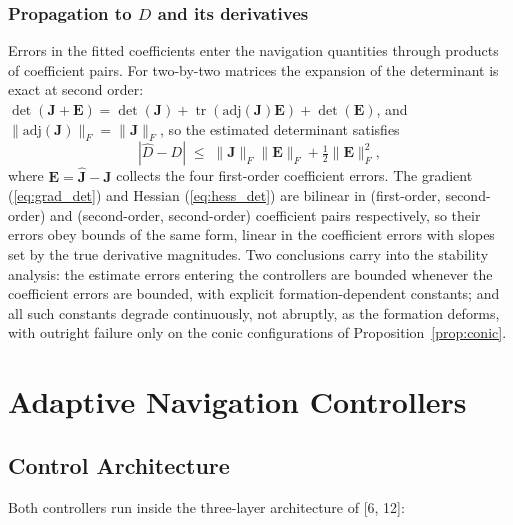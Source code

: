 \documentclass[lettersize,journal]{IEEEtran}
\begin{document}
\subsubsection{Propagation to $D$ and its derivatives}
Errors in the fitted coefficients enter the navigation quantities through
products of coefficient pairs. For two-by-two matrices the expansion of
the determinant is exact at second order:
$\det(\mathbf{J} + \mathbf{E}) = \det(\mathbf{J}) +
\operatorname{tr}(\mathrm{adj}(\mathbf{J})\mathbf{E}) + \det(\mathbf{E})$,
and $\|\mathrm{adj}(\mathbf{J})\|_F = \|\mathbf{J}\|_F$, so the estimated
determinant satisfies
\begin{equation}
    |\hat{D} - D| \;\leq\; \|\mathbf{J}\|_F \|\mathbf{E}\|_F
    + \tfrac{1}{2}\|\mathbf{E}\|_F^2,
    \label{eq:det_perturbation}
\end{equation}
where $\mathbf{E} = \hat{\mathbf{J}} - \mathbf{J}$ collects the four
first-order coefficient errors. The gradient (\ref{eq:grad_det}) and
Hessian (\ref{eq:hess_det}) are bilinear in (first-order, second-order)
and (second-order, second-order) coefficient pairs respectively, so their
errors obey bounds of the same form, linear in the coefficient errors
with slopes set by the true derivative magnitudes. Two conclusions carry
into the stability analysis: the estimate errors entering the controllers
are bounded whenever the coefficient errors are bounded, with explicit
formation-dependent constants; and all such constants degrade
continuously, not abruptly, as the formation deforms, with outright
failure only on the conic configurations of
Proposition~\ref{prop:conic}.


\section{Adaptive Navigation Controllers}
\label{sec:controllers}

\subsection{Control Architecture}
\label{sec:arch}

Both controllers run inside the three-layer architecture of [6, 12]:
\end{document}
